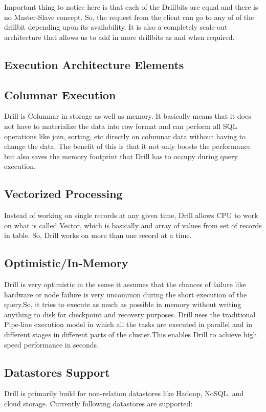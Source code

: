 \documentclass[9pt,twocolumn,twoside]{../../styles/osajnl}
\begin{document}
Important thing to notice here is that each of the Drillbits are equal and there is no Master-Slave concept. So, the request from the client can go to any of of the drillbit depending upon its availability. It is also a completely scale-out architecture that allows us to add in more drillbits as and when required\cite{Query-Execution}.

\subsection{Execution Architecture Elements}
\subsection{Columnar Execution}
Drill is Columnar in storage as well as memory. It basically means that it does not have to materialize the data into row format and can perform all SQL operations like join, sorting, etc directly on columnar data  without having to change the data. The benefit of this is that it not only boosts the performance but also saves the memory footprint that Drill has to occupy during query execution.

\subsection{Vectorized Processing}
Instead of working on single records at any given time, Drill allows CPU to work on what is called Vector, which is basically and array of values from set of records in table. So, Drill works on more than one record at a time.

\subsection*{Optimistic/In-Memory}
Drill is very optimistic in the sense it assumes that the chances of failure like hardware or node failure is very uncommon during the short execution of the query.So, it tries to execute as much as possible in memory without writing anything to disk for checkpoint and recovery purposes. Drill uses the traditional Pipe-line execution model in which all the tasks are executed in parallel and in different stages in different parts of the cluster.This enables Drill to achieve high speed performance in seconds.

\subsection{Datastores Support}
Drill is primarily build for non-relation datastores like Hadoop, NoSQL, and cloud storage.
Currently following datastores are supported:
\end{document}
